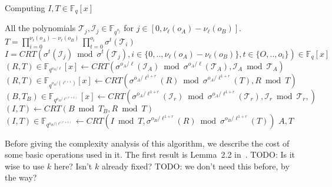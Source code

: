\documentclass{lms}
\newcommand{\todo}[1]{{\color{red}TODO: #1}}
\begin{document}
\begin{algorithm}
\caption{\label{computingT2ir} Computing $I,T \in \mathbb{F}_q[x]$} 
\begin{algorithmic}[5]
\REQUIRE All the polynomials $\mathcal{T}_j, \mathcal{I}_j \in \mathbb{F}_{q^{o_j}}$ for $j \in [0, \nu_{\ell}(o_A)-\nu_{\ell}(o_B)]$. 
\ENSURE $T=\prod_{i=0}^{\nu_{\ell}(o_A)-\nu_{\ell}(o_B)}\prod_{t=0}^{o_i}\sigma^{t}(\mathcal{T}_i)$ $I= CRT(\sigma^{t}(\mathcal{I}_j) \bmod \sigma^{t}(\mathcal{T}_j), i\in \{ 0,.., \nu_{\ell}(o_A)-\nu_{\ell}(o_B) \}  ,t \in \{ O,..,o_i \} ) \in \mathbb{F}_q[x]$
\STATE $\left( R,T \right) \in \mathbb{F}_{q^{o_A/\ell}}[x] \gets CRT \left( \sigma^{o_A/\ell}(\mathcal{I}_A) \bmod  \sigma^{o_A/\ell}(\mathcal{T}_A),\mathcal{I}_A \bmod \mathcal{T}_A \right)$
\STATE $\left( R , T \right) \in \mathbb{F}_{q^{o_A/(\ell^{r+1})}}[x] \gets CRT \left( \sigma^{o_A/\ell^{1+r}}(R) \bmod \sigma^{o_A/\ell^{1+r}}(T), R \bmod T \right) $ 
\STATE $\left( B,T_B \right)\in \mathbb{F}_{q^{o_A/\ell^{(r+1)}}}[x]  \gets CRT \left( \sigma^{o_A/\ell^{1+r}}(\mathcal{I}_r) \bmod \sigma^{o_A/\ell^{1+r}} (\mathcal{T}_r),\mathcal{I}_r \bmod \mathcal{T}_r, \right)$ 
\STATE $\left( I,T \right) \gets CRT \left(B \bmod T_B, R \bmod T \right) $
\ENDFOR
{}%
\STATE $\left( I , T \right)\in \mathbb{F}_{q^{o_B/(\ell^{(r+1)}}} \gets CRT \left( I \bmod T ,\sigma^{o_B/\ell^{1+r}}(R) \bmod \sigma^{o_B/\ell^{1+r}}(T) \right)$
\ENDFOR
\RETURN $A,T$
\end{algorithmic}
\end{algorithm}

Before giving the complexity analysis of this algorithm, we describe
the cost of some basic operations used in it. The first result is
Lemma~2.2 in~\cite{vzgathen+shoup92}.  \todo{Is it wise to use $k$
  here? Isn't $k$ already fixed?}
\todo{we don't need this before, by the way?}
\end{document}
